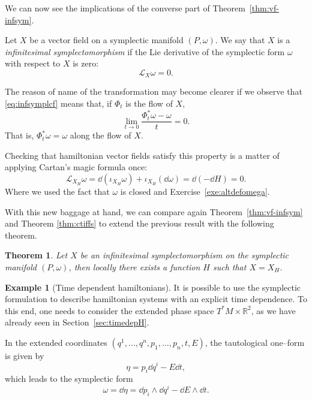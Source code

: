 \documentclass[english,fontsize=11pt,paper=b5]{scrbook}
\numberwithin{equation}{chapter}
\newtheorem{theorem}{Theorem}[chapter]
\theoremstyle{definition}
\newtheorem{example}{Example}[chapter]
\begin{document}
    We can now see the implications of the converse part of Theorem~\ref{thm:vf-infsym}.

    \begin{tcolorbox}
      Let $X$ be a vector field on a symplectic manifold $(P,\omega)$.
      We say that $X$ is a \emph{infinitesimal symplectomorphism} if the Lie derivative of the symplectic form $\omega$ with respect to $X$ is zero:
      \begin{equation}\label{eq:infsymplcf}
        \mathcal{L}_X \omega = 0.
      \end{equation}
    \end{tcolorbox}

    The reason of name of the transformation may become clearer if we observe that \eqref{eq:infsymplcf} means that, if $\Phi_t$ is the flow of $X$,
    \begin{equation}
      \lim_{t\to 0} \frac{\Phi_t^*\omega - \omega}{t} = 0.
    \end{equation}
    That is, $\Phi_t^*\omega = \omega$ along the flow of $X$.

    Checking that hamiltonian vector fields satisfy this property is a matter of applying Cartan's magic formula once:
    \begin{equation}
      \mathcal{L}_{X_H} \omega = \dd(\iota_{X_H} \omega) + \iota_{X_H}(\dd \omega)
      = \dd(-\dd H) = 0.
    \end{equation}
    Where we used the fact that $\omega$ is closed and Exercise~\ref{exe:altdefomega}.

    With this new baggage at hand, we can compare again Theorem~\ref{thm:vf-infsym} and Theorem \ref{thm:ctiffs} to extend the previous result with the following theorem.

    \begin{theorem}
      Let $X$ be an infinitesimal symplectomorphism on the symplectic manifold $(P,\omega)$, then locally there exists a function $H$ such that $X = X_H$.
    \end{theorem}


    \begin{example}[Time dependent hamiltonians]\label{ex:timedepH}
      It is possible to use the symplectic formulation to describe hamiltonian systems with an explicit time dependence.
      To this end, one needs to consider the extended phase space $T^*M\times\mathbb{R}^2$, as we have already seen in Section~\ref{sec:timedepH}.

      In the extended coordinates $(q^1, \ldots, q^n, p_1,\ldots,p_n,t,E)$, the tautological one--form is given by
      \begin{equation}
        \eta = p_i\dd q^i -E\dd t,
      \end{equation}
      which leads to the symplectic form
      \begin{equation}
        \omega = \dd\eta = \dd p_i \wedge \dd q^i -\dd E \wedge \dd t.
      \end{equation}
    \end{example}
\end{document}
